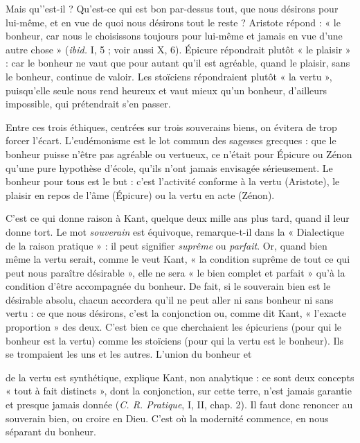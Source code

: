 Mais qu'’est-il ? Qu'est-ce qui est bon par-dessus tout, que nous désirons
pour lui-même, et en vue de quoi nous désirons tout le reste ? Aristote répond :
« le bonheur, car nous le choisissons toujours pour lui-même et jamais en vue
d’une autre chose » ({\it ibid.} I, 5 ; voir aussi X, 6). Épicure répondrait plutôt « le
plaisir » : car le bonheur ne vaut que pour autant qu’il est agréable, quand le
plaisir, sans le bonheur, continue de valoir. Les stoïciens répondraient plutôt
« la vertu », puisqu’elle seule nous rend heureux et vaut mieux qu’un bonheur,
d’ailleurs impossible, qui prétendrait s’en passer.

Entre ces trois éthiques, centrées sur trois souverains biens, on évitera de
trop forcer l'écart. L’eudémonisme est le lot commun des sagesses grecques :
que le bonheur puisse n’être pas agréable ou vertueux, ce n’était pour Épicure
ou Zénon qu’une pure hypothèse d’école, qu’ils n’ont jamais envisagée sérieusement.
Le bonheur pour tous est le but : c’est l’activité conforme à la vertu
(Aristote), le plaisir en repos de l’âme (Épicure) ou la vertu en acte (Zénon).

C’est ce qui donne raison à Kant, quelque deux mille ans plus tard, quand
il leur donne tort. Le mot {\it souverain} est équivoque, remarque-t-il dans la
« Dialectique de la raison pratique » : il peut signifier {\it suprême} ou {\it parfait}. Or,
quand bien même la vertu serait, comme le veut Kant, « la condition suprême
de tout ce qui peut nous paraître désirable », elle ne sera « le bien complet et
parfait » qu’à la condition d’être accompagnée du bonheur. De fait, si le souverain
bien est le désirable absolu, chacun accordera qu’il ne peut aller ni sans
bonheur ni sans vertu : ce que nous désirons, c’est la conjonction ou, comme
dit Kant, « l’exacte proportion » des deux. C’est bien ce que cherchaient les épicuriens
(pour qui le bonheur est la vertu) comme les stoïciens (pour qui la vertu
est le bonheur). Ils se trompaient les uns et les autres. L’union du bonheur et

de la vertu est synthétique, explique Kant, non analytique : ce sont deux concepts
« tout à fait distincts », dont la conjonction, sur cette terre, n’est jamais
garantie et presque jamais donnée ({\it C. R. Pratique}, I, II, chap. 2). Il faut donc
renoncer au souverain bien, ou croire en Dieu. C’est où la modernité commence,
en nous séparant du bonheur.


